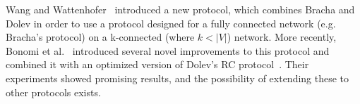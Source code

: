 Wang and Wattenhofer~\cite{bracha-dolev} introduced a new protocol, which combines Bracha and Dolev in order to use a protocol designed for a fully connected network (e.g. Bracha's protocol) on a k-connected (where $k < |V|$) network. More recently, Bonomi et al.~\cite{bonomi2021practical} introduced several novel improvements to this protocol and combined it with an optimized version of Dolev's RC protocol~\cite{dolev-improvement,bonomi2019multihop}. Their experiments showed promising results, and the possibility of extending these to other protocols exists. 
